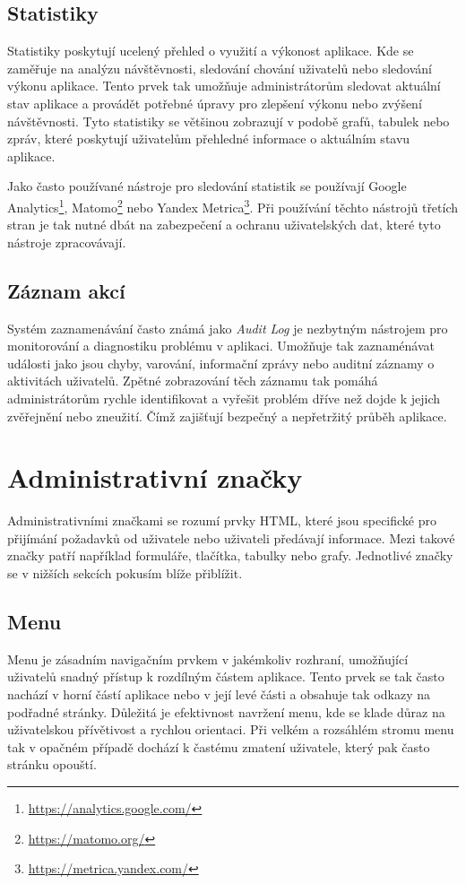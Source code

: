 \subsection{Statistiky}
\label{subsec:admin-elements-statistics}
Statistiky poskytují ucelený přehled o využití a výkonost aplikace. Kde se zaměřuje na analýzu návštěvnosti, sledování chování uživatelů nebo sledování výkonu aplikace. Tento prvek tak umožňuje administrátorům sledovat aktuální stav aplikace a provádět potřebné úpravy pro zlepšení výkonu nebo zvýšení návštěvnosti.
Tyto statistiky se většinou zobrazují v podobě grafů, tabulek nebo zpráv, které poskytují uživatelům přehledné informace o aktuálním stavu aplikace.

Jako často používané nástroje pro sledování statistik se používají Google Analytics\footnote[4]{\url{https://analytics.google.com/}}, Matomo\footnote[5]{\url{https://matomo.org/}} nebo Yandex Metrica\footnote[6]{\url{https://metrica.yandex.com/}}. Při používání těchto nástrojů třetích stran je tak nutné dbát na zabezpečení a ochranu uživatelských dat, které tyto nástroje zpracovávají.

\subsection{Záznam akcí}
\label{subsec:admin-elements-logs}
Systém zaznamenávání často známá jako \textit{Audit Log} je nezbytným nástrojem pro monitorování a diagnostiku problému v aplikaci. Umožňuje tak zaznaménávat události jako jsou chyby, varování, informační zprávy nebo auditní záznamy o aktivitách uživatelů. Zpětné zobrazování těch záznamu tak pomáhá administrátorům rychle identifikovat a vyřešit problém dříve než dojde k jejich zvěřejnění nebo zneužití. Čímž zajišťují bezpečný a nepřetržitý průběh aplikace.

\section{Administrativní značky}
\label{sec:admin-tags}
Administrativními značkami se rozumí prvky HTML, které jsou specifické pro přijímání požadavků od uživatele nebo uživateli předávají informace. Mezi takové značky patří například formuláře, tlačítka, tabulky nebo grafy. Jednotlivé značky se v nižších sekcích pokusím blíže přiblížit.

\subsection*{Menu}
\label{subsec:admin-tags-menu}
Menu je zásadním navigačním prvkem v jakémkoliv rozhraní, umožňující uživatelů snadný přístup k rozdílným částem aplikace. Tento prvek se tak často nachází v horní částí aplikace nebo v její levé části a obsahuje tak odkazy na podřadné stránky. Důležitá je efektivnost navržení menu, kde se klade důraz na uživatelskou přívětivost a rychlou orientaci. Při velkém a rozsáhlém stromu menu tak v opačném případě dochází k častému zmatení uživatele, který pak často stránku opouští.

